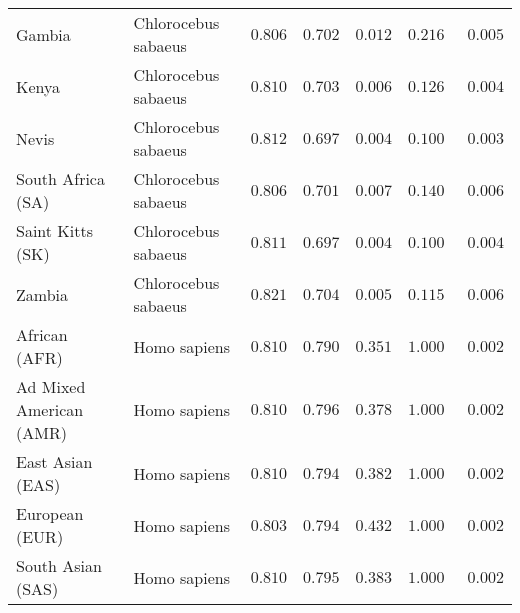 \begin{center}
\begin{adjustbox}{width = 1\textwidth}
\begin{tabular}{|l|l|r|r|r|r|r|}
            Gambia                          & Chlorocebus sabaeus & $ 0.806$ & $ 0.702$ & $ 0.012$ & $ 0.216~~$     & $ 0.005$ \\
            Kenya              & Chlorocebus sabaeus & $ 0.810$ & $ 0.703$ & $ 0.006$ & $ 0.126~~$     & $ 0.004$ \\
            Nevis               & Chlorocebus sabaeus & $ 0.812$ & $ 0.697$ & $ 0.004$ & $ 0.100~~$     & $ 0.003$ \\
            South Africa (SA)                         & Chlorocebus sabaeus & $ 0.806$ & $ 0.701$ & $ 0.007$ & $ 0.140~~$     & $ 0.006$ \\
            Saint Kitts (SK)                  & Chlorocebus sabaeus        & $ 0.811$ & $ 0.697$ & $ 0.004$ & $ 0.100~~$     & $ 0.004$ \\
            Zambia        & Chlorocebus sabaeus        & $ 0.821$ & $ 0.704$ & $ 0.005$ & $ 0.115~~$     & $ 0.006$ \\
            African (AFR)               & Homo sapiens        & $ 0.810$ & $ 0.790$ & $ 0.351$ & $ 1.000~~$     & $ 0.002$ \\
            Ad Mixed American (AMR)                 & Homo sapiens        & $ 0.810$ & $ 0.796$ & $ 0.378$ & $ 1.000~~$     & $ 0.002$ \\
            East Asian (EAS)              & Homo sapiens        & $ 0.810$ & $ 0.794$ & $ 0.382$ & $ 1.000~~$     & $ 0.002$ \\
            European (EUR)              & Homo sapiens        & $ 0.803$ & $ 0.794$ & $ 0.432$ & $ 1.000~~$     & $ 0.002$ \\
            South Asian (SAS)              & Homo sapiens        & $ 0.810$ & $ 0.795$ & $ 0.383$ & $ 1.000~~$     & $ 0.002$ \\
            \bottomrule
        \end{tabular}
    \end{adjustbox}
\end{center}